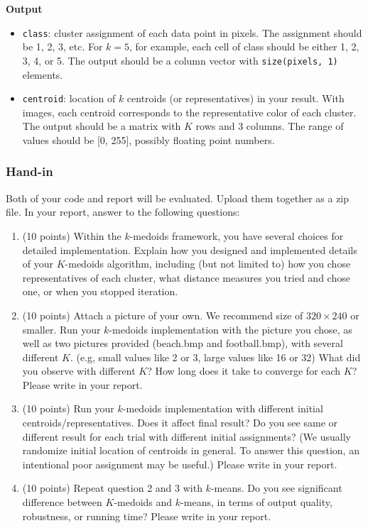 \documentclass[twoside,10pt]{article}
\begin{document}
\textbf{Output}
\begin{itemize}
  \item \texttt{class}: cluster assignment of each data point in pixels. The assignment should be 1, 2, 3, etc. For $k = 5$, for example, each cell of class should be either 1, 2, 3, 4, or 5. The output should be a column vector with \texttt{size(pixels, 1)} elements.
  \item \texttt{centroid}: location of $k$ centroids (or representatives) in your result. With images, each centroid corresponds to the representative color of each cluster. The output should be a matrix with $K$ rows and 3 columns. The range of values should be [0, 255], possibly floating point numbers.
\end{itemize}

\subsubsection*{Hand-in}
Both of your code and report will be evaluated. Upload them together as a zip file. In your report, answer to the following questions:
\begin{enumerate}
  \item (10 points) Within the $k$-medoids framework, you have several choices for detailed implementation. Explain how you designed and implemented details of your $K$-medoids algorithm, including (but not limited to) how you chose representatives of each cluster, what distance measures you tried and chose one, or when you stopped iteration.
  \item (10 points) Attach a picture of your own. We recommend size of $320 \times 240$ or smaller. Run your $k$-medoids implementation with the picture you chose, as well as two pictures provided (\textsf{beach.bmp} and \textsf{football.bmp}), with several different $K$. (e.g, small values like 2 or 3, large values like 16 or 32) What did you observe with different $K$? How long does it take to converge for each $K$? Please write in your report. 
  \item (10 points) Run your $k$-medoids implementation with different initial centroids/representatives. Does it affect final result? Do you see same or different result for each trial with different initial assignments? (We usually randomize initial location of centroids in general. To answer this question, an intentional poor assignment may be useful.) Please write in your report. 
  \item (10 points) Repeat question 2 and 3 with $k$-means. Do you see significant difference between $K$-medoids and $k$-means, in terms of output quality, robustness, or running time? Please write in your report. 
\end{enumerate}
\end{document}
